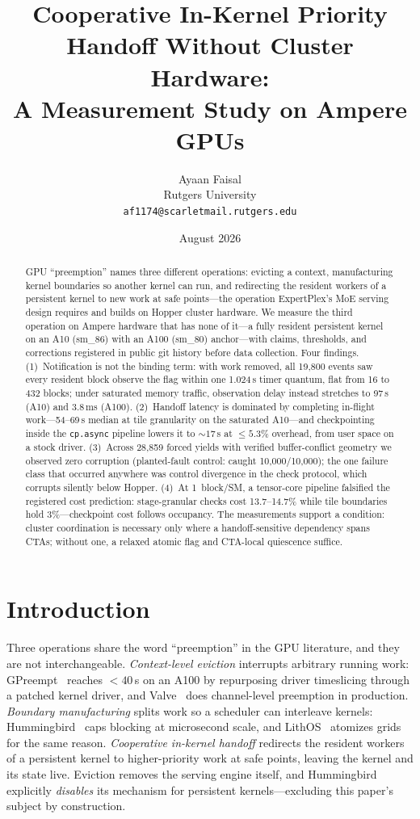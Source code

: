 \documentclass[11pt]{article}
\title{Cooperative In-Kernel Priority Handoff Without Cluster Hardware:\\
A Measurement Study on Ampere GPUs}
\author{Ayaan Faisal\\ Rutgers University\\ \texttt{af1174@scarletmail.rutgers.edu}}
\date{August 2026}
\newcommand{\us}{\,\textmu s\xspace}
\begin{document}
\maketitle

\begin{abstract}
GPU ``preemption'' names three different operations: evicting a
context, manufacturing kernel boundaries so another kernel can run,
and redirecting the resident workers of a persistent kernel to new
work at safe points---the operation ExpertPlex's MoE serving design
requires and builds on Hopper cluster hardware. We measure the third
operation on Ampere hardware that has none of it---a fully resident
persistent kernel on an A10 (sm\_86) with an A100 (sm\_80)
anchor---with claims, thresholds, and corrections registered in
public git history before data collection. Four findings. (1)~Notification is not the binding term:
with work removed, all 19{,}800 events saw every resident block
observe the flag within one 1.024\us{} timer quantum, flat from 16
to 432 blocks; under saturated memory traffic, observation delay
instead stretches to 97\us{} (A10) and 3.8\,ms (A100). (2)~Handoff
latency is dominated by completing in-flight work---54--69\us{}
median at tile granularity on the saturated A10---and checkpointing
inside the \texttt{cp.async} pipeline lowers it to ${\sim}17$\us{}
at ${\le}5.3\%$ overhead, from user space on a stock driver.
(3)~Across 28{,}859 forced yields with verified buffer-conflict
geometry we observed zero corruption (planted-fault control: caught
10{,}000/10{,}000); the one failure class that occurred anywhere was
control divergence in the check protocol, which corrupts silently
below Hopper. (4)~At 1~block/SM, a tensor-core pipeline falsified
the registered cost prediction: stage-granular checks cost
13.7--14.7\% while tile boundaries hold 3\%---checkpoint cost
follows occupancy. The measurements support a condition: cluster
coordination is necessary only where a handoff-sensitive dependency
spans CTAs; without one, a relaxed atomic flag and CTA-local
quiescence suffice.
\end{abstract}

\section{Introduction}

Three operations share the word ``preemption'' in the GPU literature,
and they are not interchangeable. \emph{Context-level eviction}
interrupts arbitrary running work: GPreempt~\cite{gpreempt} reaches
${<}40$\us{} on an A100 by repurposing driver timeslicing through a
patched kernel driver, and Valve~\cite{valve} does channel-level
preemption in production. \emph{Boundary manufacturing} splits work
so a scheduler can interleave kernels: Hummingbird~\cite{hummingbird}
caps blocking at microsecond scale, and LithOS~\cite{lithos} atomizes
grids for the same reason. \emph{Cooperative in-kernel handoff}
redirects the resident workers of a persistent kernel to
higher-priority work at safe points, leaving the kernel and its state
live. Eviction removes the serving engine itself, and Hummingbird
explicitly \emph{disables} its mechanism for persistent
kernels---excluding this paper's subject by construction.
\end{document}
